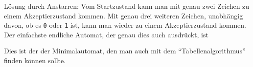 
\begin{loesung}
Lösung durch Anstarren: Vom Startzustand kann man mit genau zwei Zeichen
zu einem Akzeptierzustand kommen.
Mit genau drei weiteren Zeichen, unabhängig davon, ob es \texttt{0} oder
\texttt{1} ist, kann man wieder zu einem Akzeptierzustand kommen.
Der einfachste endliche Automat, der genau dies auch ausdrückt, ist
\begin{center}
\def\r{0.35}
\def\zustand#1#2{
	\ifthenelse{\boolean{loesungen}}{
		\fill[color=#2!20] #1 circle[radius=\r];
	}{
		\fill[color=white] #1 circle[radius=\r];
	}
	\draw #1 circle[radius=\r];
}
\def\akzeptierzustand#1#2{
	\ifthenelse{\boolean{loesungen}}{
		\fill[color=#2!20] #1 circle[radius=\r];
	}{
		\fill[color=white] #1 circle[radius=\r];
	}
	\draw #1 circle[radius=\r];
	\draw #1 circle[radius={\r-0.05}];
}
\def\pfeil#1{
	\draw[->,shorten >= 0.35cm,shorten <= 0.35cm] #1 -- ($#1+(2,0)$);
	\node at ($#1+(1,0)$) [above] {\texttt{0},\texttt{1}};
}
\end{center}
Dies ist der der Minimalautomat, den man auch mit dem ``Tabellenalgorithmus''
finden können sollte.


\end{loesung}
